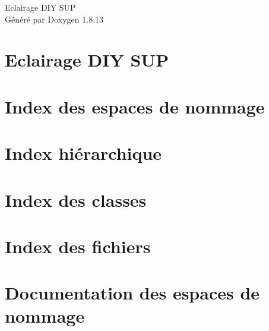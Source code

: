 \documentclass[twoside]{book}
\newcommand{\+}{\discretionary{\mbox{\scriptsize$\hookleftarrow$}}{}{}}
\newcommand{\clearemptydoublepage}{%
  \newpage{\pagestyle{empty}\cleardoublepage}%
}
\begin{document}
\hypersetup{pageanchor=false,
             bookmarksnumbered=true,
             pdfencoding=unicode
            }
\begin{titlepage}
\vspace*{7cm}
\begin{center}%
{\Large Eclairage D\+IY S\+UP }\\
\vspace*{1cm}
{\large Généré par Doxygen 1.8.13}\\
\end{center}
\end{titlepage}
\clearemptydoublepage
{}
\tableofcontents
\clearemptydoublepage
{}
\hypersetup{pageanchor=true}

\chapter{Eclairage D\+IY S\+UP}
\label{index}\hypertarget{index}{}
\chapter{Index des espaces de nommage}

\chapter{Index hiérarchique}

\chapter{Index des classes}

\chapter{Index des fichiers}

\chapter{Documentation des espaces de nommage}



\end{document}
